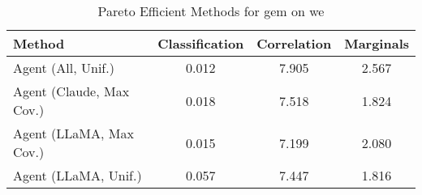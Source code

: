 \begin{table}[t!]
    \centering
    \caption{Pareto Efficient Methods for gem on we}
    \label{tab:pareto_efficient_methods_gem_we}
    \begin{tabular}{lccc}
    \toprule
    Method & Classification & Correlation & Marginals \\
    \midrule
    Agent (All, Unif.) & \cellcolor{gold!30}0.012 & 7.905 & 2.567 \\
    Agent (Claude, Max Cov.) & \cellcolor{bronze!30}0.018 & \cellcolor{bronze!30}7.518 & \cellcolor{silver!30}1.824 \\
    Agent (LLaMA, Max Cov.) & \cellcolor{silver!30}0.015 & \cellcolor{gold!30}7.199 & \cellcolor{bronze!30}2.080 \\
    Agent (LLaMA, Unif.) & 0.057 & \cellcolor{silver!30}7.447 & \cellcolor{gold!30}1.816 \\
    \bottomrule
    \end{tabular}
\end{table}